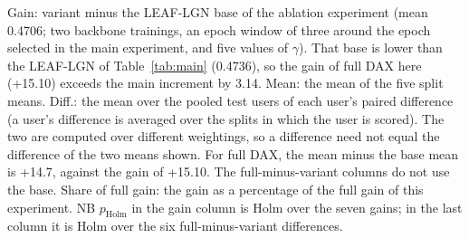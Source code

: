 \begin{table}[tbp]
\begin{minipage}{\linewidth}\raggedright\footnotesize Gain: variant minus the LEAF-LGN base of the ablation experiment (mean 0.4706; two backbone trainings, an epoch window of three around the epoch selected in the main experiment, and five values of $\gamma$). That base is lower than the LEAF-LGN of Table~\ref{tab:main} (0.4736), so the gain of full DAX here (+15.10) exceeds the main increment by 3.14. Mean: the mean of the five split means. Diff.: the mean over the pooled test users of each user's paired difference (a user's difference is averaged over the splits in which the user is scored). The two are computed over different weightings, so a difference need not equal the difference of the two means shown. For full DAX, the mean minus the base mean is +14.7, against the gain of +15.10. The full-minus-variant columns do not use the base. Share of full gain: the gain as a percentage of the full gain of this experiment. NB $p_{\mathrm{Holm}}$ in the gain column is Holm over the seven gains; in the last column it is Holm over the six full-minus-variant differences.\end{minipage}
\end{table}
